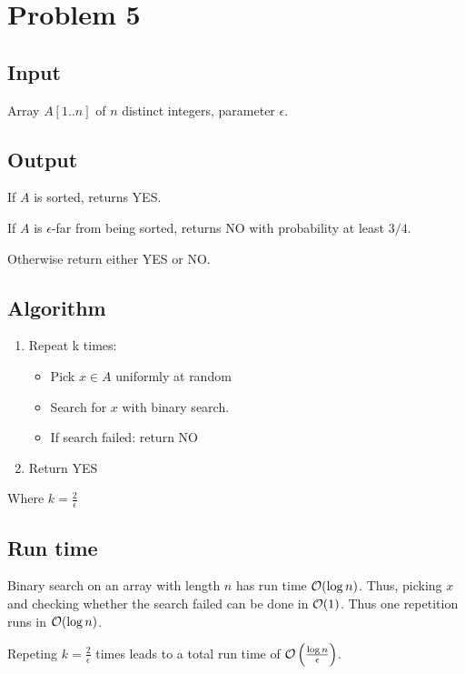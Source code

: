 \section*{Problem 5}

\subsection*{Input}

Array $A[1..n]$ of $n$ distinct integers, parameter $\epsilon$.

\subsection*{Output}

If $A$ is sorted, returns YES.

If $A$ is $\epsilon$-far from being sorted, returns NO with probability at least $3/4$.

Otherwise return either YES or NO.

\subsection*{Algorithm}


\begin{enumerate}
    \item Repeat k times:

\begin{itemize}
    \item Pick $x \in A$ uniformly at random
    \item Search for $x$ with binary search.
    \item If search failed: return NO
\end{itemize}

\item Return YES
\end{enumerate}

Where $k = \frac{2}{\epsilon}$ 


\subsection*{Run time}

Binary search on an array with length $n$ has run time $\mathcal{O}(\log n)$. Thus, picking $x$ and checking whether the search failed can be done in $\mathcal{O}(1)$.
Thus one repetition runs in $\mathcal{O}(\log n)$.

Repeting $k = \frac{2}{\epsilon}$ times leads to a total run time of $\mathcal{O}\left(\frac{\log n}\epsilon{}\right)$.

